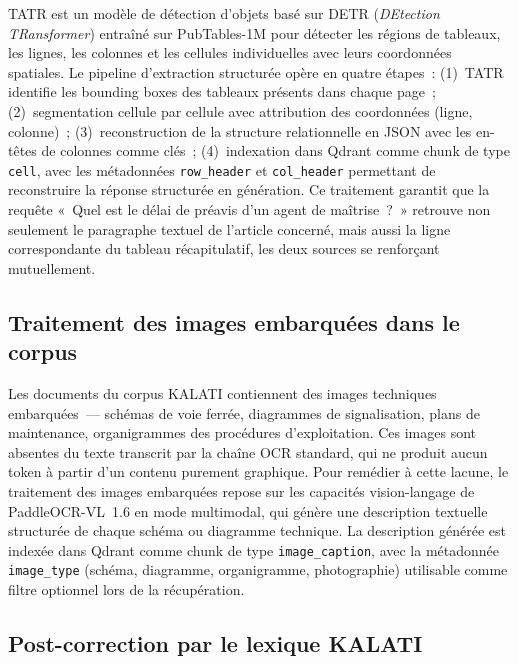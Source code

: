 \documentclass[12pt,a4paper]{report}
\begin{document}
TATR est un modèle de détection d'objets basé sur DETR (\textit{DEtection TRansformer}) entraîné
sur PubTables-1M pour détecter les régions de tableaux, les lignes, les colonnes et les cellules
individuelles avec leurs coordonnées spatiales. Le pipeline d'extraction structurée opère en
quatre étapes~: (1)~TATR identifie les bounding boxes des tableaux présents dans chaque page~;
(2)~segmentation cellule par cellule avec attribution des coordonnées (ligne, colonne)~;
(3)~reconstruction de la structure relationnelle en JSON avec les en-têtes de colonnes comme
clés~; (4)~indexation dans Qdrant comme chunk de type \texttt{cell}, avec les métadonnées
\texttt{row\_header} et \texttt{col\_header} permettant de reconstruire la réponse structurée
en génération. Ce traitement garantit que la requête «~Quel est le délai de préavis d'un agent
de maîtrise~?~» retrouve non seulement le paragraphe textuel de l'article concerné, mais aussi
la ligne correspondante du tableau récapitulatif, les deux sources se renforçant mutuellement.

\subsection{Traitement des images embarquées dans le corpus}

Les documents du corpus KALATI contiennent des images techniques embarquées~--- schémas de voie
ferrée, diagrammes de signalisation, plans de maintenance, organigrammes des procédures
d'exploitation. Ces images sont absentes du texte transcrit par la chaîne OCR standard, qui ne
produit aucun token à partir d'un contenu purement graphique. Pour remédier à cette lacune, le
traitement des images embarquées repose sur les capacités vision-langage de PaddleOCR-VL~1.6 en
mode multimodal, qui génère une description textuelle structurée de chaque schéma ou diagramme
technique. La description générée est indexée dans Qdrant comme chunk de type \texttt{image\_caption},
avec la métadonnée \texttt{image\_type} (schéma, diagramme, organigramme, photographie)
utilisable comme filtre optionnel lors de la récupération.

\subsection{Post-correction par le lexique KALATI}
\end{document}

